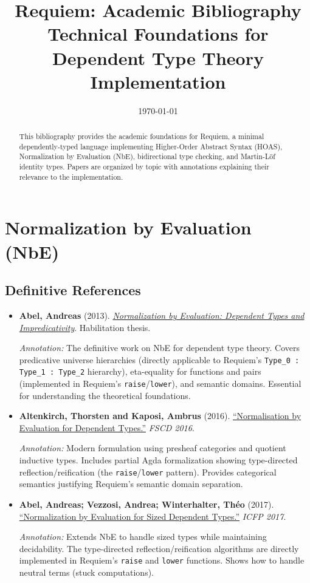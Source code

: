 \documentclass[11pt]{article}
\title{Requiem: Academic Bibliography\\
\large Technical Foundations for Dependent Type Theory Implementation}
\author{}
\date{\today}
\begin{document}
\maketitle

\begin{abstract}
This bibliography provides the academic foundations for Requiem, a minimal dependently-typed language implementing Higher-Order Abstract Syntax (HOAS), Normalization by Evaluation (NbE), bidirectional type checking, and Martin-Löf identity types. Papers are organized by topic with annotations explaining their relevance to the implementation.
\end{abstract}

\tableofcontents
\newpage

\section{Normalization by Evaluation (NbE)}

\subsection{Definitive References}

\begin{itemize}[leftmargin=*]
\item \textbf{Abel, Andreas} (2013). \href{http://www.cse.chalmers.se/~abela/habil.pdf}{\emph{Normalization by Evaluation: Dependent Types and Impredicativity}}. Habilitation thesis.

\textit{Annotation:} The definitive work on NbE for dependent type theory. Covers predicative universe hierarchies (directly applicable to Requiem's \texttt{Type\_0 : Type\_1 : Type\_2} hierarchy), eta-equality for functions and pairs (implemented in Requiem's \texttt{raise}/\texttt{lower}), and semantic domains. Essential for understanding the theoretical foundations.

\item \textbf{Altenkirch, Thorsten and Kaposi, Ambrus} (2016). \href{https://drops.dagstuhl.de/entities/document/10.4230/LIPIcs.FSCD.2016.6}{``Normalisation by Evaluation for Dependent Types.''} \emph{FSCD 2016}.

\textit{Annotation:} Modern formulation using presheaf categories and quotient inductive types. Includes partial Agda formalization showing type-directed reflection/reification (the \texttt{raise}/\texttt{lower} pattern). Provides categorical semantics justifying Requiem's semantic domain separation.

\item \textbf{Abel, Andreas; Vezzosi, Andrea; Winterhalter, Théo} (2017). \href{https://arxiv.org/abs/1706.03409}{``Normalization by Evaluation for Sized Dependent Types.''} \emph{ICFP 2017}.

\textit{Annotation:} Extends NbE to handle sized types while maintaining decidability. The type-directed reflection/reification algorithms are directly implemented in Requiem's \texttt{raise} and \texttt{lower} functions. Shows how to handle neutral terms (stuck computations).

\end{itemize}
\end{document}

